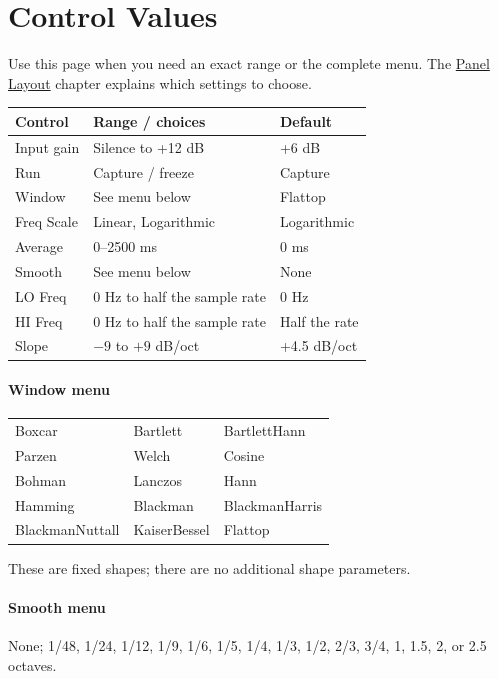\clearpage
\section{Control Values}\label{sec:control-values}

Use this page when you need an exact range or the complete menu. The
\hyperref[sec:panel]{Panel Layout} chapter explains which settings to choose.

\begin{center}
\renewcommand{\arraystretch}{1.2}
\begin{tabularx}{\textwidth}{@{}lXl@{}}
\toprule
\textbf{Control} & \textbf{Range / choices} & \textbf{Default} \\
\midrule
Input gain & Silence to +12 dB & +6 dB \\
Run & Capture / freeze & Capture \\
Window & See menu below & Flattop \\
Freq Scale & Linear, Logarithmic & Logarithmic \\
Average & 0--2500 ms & 0 ms \\
Smooth & See menu below & None \\
LO Freq & 0 Hz to half the sample rate & 0 Hz \\
HI Freq & 0 Hz to half the sample rate & Half the rate \\
Slope & $-9$ to $+9$ dB/oct & +4.5 dB/oct \\
\bottomrule
\end{tabularx}
\end{center}

\paragraph{Window menu}
\begin{center}
\begin{tabularx}{\textwidth}{@{}XXX@{}}
Boxcar & Bartlett & BartlettHann \\
Parzen & Welch & Cosine \\
Bohman & Lanczos & Hann \\
Hamming & Blackman & BlackmanHarris \\
BlackmanNuttall & KaiserBessel & Flattop \\
\end{tabularx}
\end{center}
These are fixed shapes; there are no additional shape parameters.

\paragraph{Smooth menu}
None; 1/48, 1/24, 1/12, 1/9, 1/6, 1/5, 1/4, 1/3, 1/2, 2/3, 3/4, 1,
1.5, 2, or 2.5 octaves.

